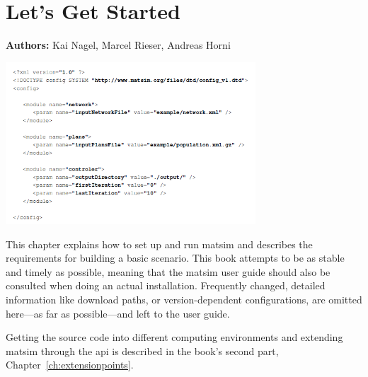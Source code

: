\chapter{Let's Get Started}
\label{ch:lgstarted}
\hfill \textbf{Authors:} Kai Nagel, Marcel Rieser, Andreas Horni

\begin{center} \includegraphics[width=0.7\textwidth, angle=0]{using/figures/config.png} \end{center}


This chapter explains how to set up and run \gls{matsim} and describes the requirements for building a basic \gls{scenario}. This book attempts to be as stable and timely as possible, meaning that the \gls{matsim} user guide \citep[][]{MATSim_Userguide_2015} should also be consulted when doing an actual installation. Frequently changed, detailed information like download paths, or version-dependent configurations, are omitted here---as far as possible---and left to the user guide. 

Getting the source code into different computing environments and extending \gls{matsim} through the \gls{api} is described in the book's second part, Chapter~\ref{ch:extensionpoints}.


